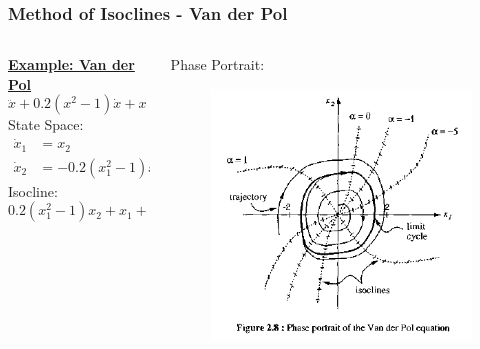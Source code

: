 \documentclass[11pt,handout]{beamer}   %
\begin{document}
\begin{frame}
\frametitle{Method of Isoclines - Van der Pol}
\begin{columns}
\begin{column}{0.5\textwidth}
\underline{\textbf{Example: Van der Pol}}
\begin{equation*}
\ddot{x} + 0.2(x^2-1)\dot{x} + x = 0
\end{equation*}
State Space:
\begin{equation*}
\begin{aligned}
\dot{x}_1 &= x_2\\
\dot{x}_2 &= -0.2(x_1^2-1)x_2 - x_1
\end{aligned}
\end{equation*}
Isocline:
\begin{equation*}
0.2(x_1^2-1)x_2 + x_1 + \alpha x_2 = 0
\end{equation*}
\end{column}
\begin{column}{0.5\textwidth}
Phase Portrait:
\begin{figure}
\centering
\includegraphics[width=\textwidth]{Figures/Isocline_2.PNG}
\end{figure}
\end{column}
\end{columns}
\end{frame}
\end{document}
